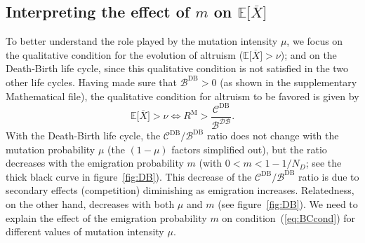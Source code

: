 \documentclass[11pt, letterpaper]{article}
\newcommand{\eqrefnoeq}[1]{(\ref{#1})}
\newcommand{\Esp}[1]{\mathbb{E}\big[ #1\big]}%
\newcommand{\Moran}{\textrm{M}}
\newcommand{\DB}{\textrm{DB}}
\newcommand{\mutbias}{\nu}
\newcommand{\ndemes}{N_D}
\begin{document}
\subsection*{Interpreting the effect of $m$ on $\Esp{\overline{X}}$}

To better understand the role played by the mutation intensity $\mu$, we focus on the qualitative condition for the evolution of altruism ($\Esp{\overline{X}} > \mutbias$); and on the Death-Birth life cycle, since this qualitative condition is not satisfied in the two other life cycles. %
Having made sure that $\mathcal{B}^{\DB}>0$ (as shown in the supplementary Mathematical file), the qualitative condition for altruism to be favored is given by 
\begin{equation}\label{eq:BCcond}
\Esp{\overline{X}} > \mutbias \Leftrightarrow R^{\Moran} > \frac{\mathcal{C}^{\DB}}{\mathcal{B^{\DB}}}.
\end{equation}
%
With the Death-Birth life cycle, the $\mathcal{C}^{\DB}/\mathcal{B}^{\DB}$ ratio does not change with the mutation probability $\mu$ (the $(1-\mu)$ factors simplified out), but the ratio decreases with the emigration probability $m$ (with $0<m<1-1/\ndemes$; see the thick black curve in figure~\ref{fig:DB}). This decrease of the $\mathcal{C}^{\DB}/\mathcal{B}^{\DB}$ ratio is due to secondary effects (competition) diminishing as emigration increases. Relatedness, on the other hand, decreases with both $\mu$ and $m$ (see figure~\ref{fig:DB}). We need to explain the effect of the emigration probability $m$ on condition~\eqrefnoeq{eq:BCcond} for different values of mutation intensity $\mu$. 
\end{document}
